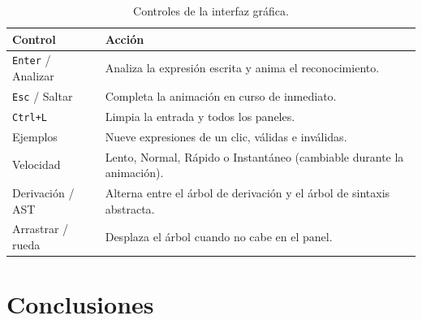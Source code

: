\documentclass[11pt,a4paper]{article}
\begin{document}
\begin{table}[H]
\centering
\caption{Controles de la interfaz gráfica.}
\begin{tabular}{l L{10.5cm}}
\toprule
{}\textbf{Control} & \textbf{Acción} \\
\midrule
\texttt{Enter} / \textsf{Analizar} & Analiza la expresión escrita y anima el reconocimiento. \\
\texttt{Esc} / \textsf{Saltar}     & Completa la animación en curso de inmediato. \\
\texttt{Ctrl+L}                    & Limpia la entrada y todos los paneles. \\
\textsf{Ejemplos}                  & Nueve expresiones de un clic, válidas e inválidas. \\
\textsf{Velocidad}                 & Lento, Normal, Rápido o Instantáneo (cambiable durante la animación). \\
\textsf{Derivación / AST}          & Alterna entre el árbol de derivación y el árbol de sintaxis abstracta. \\
Arrastrar / rueda                  & Desplaza el árbol cuando no cabe en el panel. \\
\bottomrule
\end{tabular}
\end{table}

\section{Conclusiones}
\end{document}
